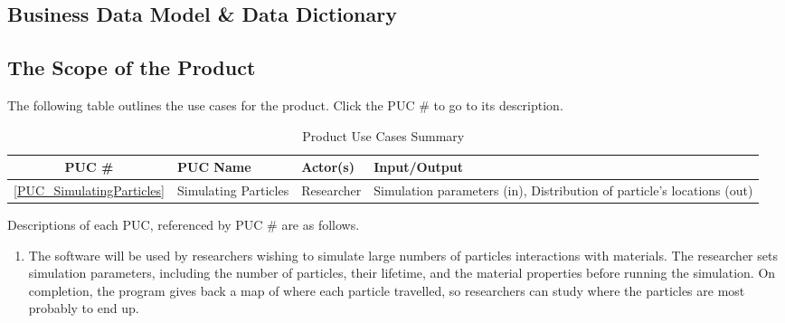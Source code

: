 \documentclass[12pt]{article}
\begin{document}
\subsection{Business Data Model \& Data Dictionary} %
\subsection{The Scope of the Product}
The following table outlines the use cases for the product. Click the PUC \# to go to its description.
\begin{table}[h]
\centering
\begin{tabularx}{\textwidth}{|c|l|l|X|}
\hline
PUC \# & PUC Name & Actor(s) & Input/Output\\
\hline\hline
\ref{PUC_SimulatingParticles} & Simulating Particles & Researcher & Simulation parameters (in), Distribution of particle's locations (out)\\
\hline
\end{tabularx}
\caption{Product Use Cases Summary}
\end{table}
Descriptions of each PUC, referenced by PUC \# are as follows.
\begin{enumerate}
\item \label{PUC_SimulatingParticles} The software will be used by researchers wishing to simulate large numbers of particles interactions with materials. The researcher sets simulation parameters, including the number of particles, their lifetime, and the material properties before running the simulation. On completion, the program gives back a map of where each particle travelled, so researchers can study where the particles are most probably to end up.
\end{enumerate}
\end{document}
